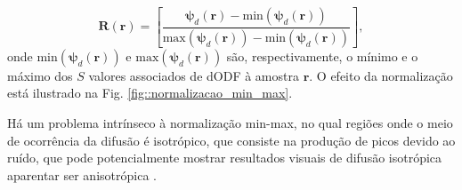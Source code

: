 \documentclass[
    12pt,                %
    oneside,            %
    a4paper,            %
    english,            %
    french,                %
    spanish,            %
    brazil                %
    ]{abntex2}
\begin{document}




\begin{equation}
\label{eq::dODF2min_max}
    \boldsymbol{R}(\mathbf{r}) = [ \frac{\boldsymbol{\psi}_d(\mathbf{r}) - \text{min}(\boldsymbol{\psi}_d(\mathbf{r}))}{\text{max}(\boldsymbol{\psi}_d(\mathbf{r})) - \text{min}(\boldsymbol{\psi}_d(\mathbf{r}))}],
\end{equation}
onde $\text{min}(\boldsymbol{\psi}_d(\mathbf{r}))$ e $\text{max}(\boldsymbol{\psi}_d(\mathbf{r}))$ são, respectivamente, o mínimo e o máximo dos $S$ valores associados de dODF à amostra $\mathbf{r}$. O efeito da normalização está ilustrado na Fig. \ref{fig::normalizacao_min_max}. 

Há um problema intrínseco à normalização min-max, no qual regiões onde o meio de ocorrência da difusão é isotrópico, que consiste na produção de picos devido ao ruído, que pode potencialmente mostrar resultados visuais de difusão isotrópica aparentar ser anisotrópica \cite{TuchQBall2004}.


\end{document}
